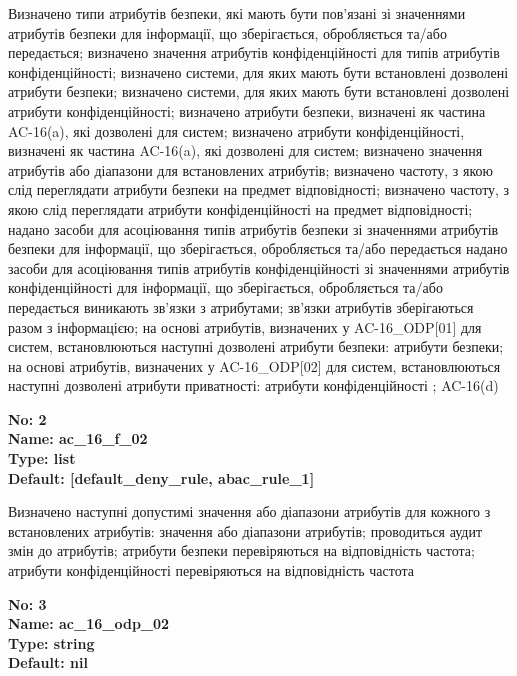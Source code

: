 \documentclass{article}
\begin{document}
{\footnotesize Визначено типи атрибутів безпеки, які мають бути пов'язані зі значеннями атрибутів безпеки для інформації, що зберігається, обробляється та/або передається; визначено значення атрибутів конфіденційності для типів атрибутів конфіденційності; визначено системи, для яких мають бути встановлені дозволені атрибути безпеки; визначено системи, для яких мають бути встановлені дозволені атрибути конфіденційності; визначено атрибути безпеки, визначені як частина AC-16(a), які дозволені для систем; визначено атрибути конфіденційності, визначені як частина AC-16(a), які дозволені для систем; визначено значення атрибутів або діапазони для встановлених атрибутів; визначено частоту, з якою слід переглядати атрибути безпеки на предмет відповідності; визначено частоту, з якою слід переглядати атрибути конфіденційності на предмет відповідності; надано засоби для асоціювання типів атрибутів безпеки зі значеннями атрибутів безпеки для інформації, що зберігається, обробляється та/або передається надано засоби для асоціювання типів атрибутів конфіденційності зі значеннями атрибутів конфіденційності для інформації, що зберігається, обробляється та/або передається виникають зв'язки з атрибутами; зв'язки атрибутів зберігаються разом з інформацією; на основі атрибутів, визначених у AC-16\_\allowbreak{}ODP[01] для систем, встановлюються наступні дозволені атрибути безпеки: атрибути безпеки; на основі атрибутів, визначених у AC-16\_\allowbreak{}ODP[02] для систем, встановлюються наступні дозволені атрибути приватності: атрибути конфіденційності ; AC-16(d)}


{\footnotesize\bfseries
No: 2\\
Name: ac\_\allowbreak{}16\_\allowbreak{}f\_\allowbreak{}02\\
Type: list\\
Default: [\textquotedbl{}default\_\allowbreak{}deny\_\allowbreak{}rule\textquotedbl{}, \textquotedbl{}abac\_\allowbreak{}rule\_\allowbreak{}1\textquotedbl{}]
}

{\footnotesize Визначено наступні допустимі значення або діапазони атрибутів для кожного з встановлених атрибутів: значення або діапазони атрибутів; проводиться аудит змін до атрибутів; атрибути безпеки перевіряються на відповідність частота; атрибути конфіденційності перевіряються на відповідність частота}


{\footnotesize\bfseries
No: 3\\
Name: ac\_\allowbreak{}16\_\allowbreak{}odp\_\allowbreak{}02\\
Type: string\\
Default: nil
}
\end{document}
